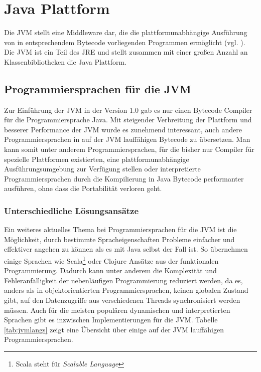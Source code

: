 \section{Java Plattform}
Die \ac{JVM} stellt eine Middleware dar, die die platt\-form\-unabhängige
Ausführung von in entsprechendem Bytecode vorliegenden Programmen ermöglicht (vgl.
\cite{wiki:jvm}). Die \ac{JVM} ist ein Teil des \ac{JRE} und stellt zusammen mit
einer großen Anzahl an Klassenbibliotheken die Java Plattform.

\subsection{Programmiersprachen für die JVM}
Zur Einführung der \ac{JVM} in der Version 1.0 gab es nur
einen Bytecode Compiler für die Programmiersprache Java. Mit steigender
Verbreitung der Plattform und besserer Performance der \ac{JVM} wurde es
zunehmend interessant, auch andere Programmiersprachen in auf der \ac{JVM}
lauffähigen Bytecode zu übersetzen. Man kann somit unter anderem
Programmiersprachen, für die bisher nur Compiler für spezielle Plattformen
existierten, eine plattformunabhängige Ausführungsumgebung zur Verfügung
stellen oder interpretierte Programmiersprachen durch die Kompilierung in Java
Bytecode performanter ausführen, ohne dass die Portabilität verloren geht.

\subsubsection{Unterschiedliche Lösungsansätze}
Ein weiteres aktuelles Thema bei Programmiersprachen für die \ac{JVM} ist die
Möglichkeit, durch bestimmte Spracheigenschaften Probleme einfacher und
effektiver angehen zu können als es mit Java selbst der Fall ist. So übernehmen
einige Sprachen wie Scala\footnote{Scala steht für \emph{Scalable Language}} oder
Clojure Ansätze aus der funktionalen Programmierung. Dadurch kann unter anderem
die Komplexität und Fehleranfälligkeit der nebenläufigen Programmierung
reduziert werden, da es, anders als in objektorientierten Programmiersprachen,
keinen globalen Zustand gibt, auf den Datenzugriffe aus verschiedenen Threads
synchronisiert werden müssen. Auch für die meisten populären dynamischen und
interpretierten Sprachen gibt es inzwischen Implementierungen für die \ac{JVM}.
Tabelle \ref{tab:jvmlangs} zeigt eine Übersicht über einige auf der \ac{JVM}
lauffähigen Programmiersprachen.

